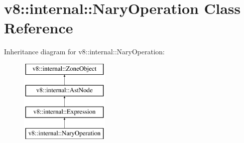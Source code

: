 \hypertarget{classv8_1_1internal_1_1NaryOperation}{}\section{v8\+:\+:internal\+:\+:Nary\+Operation Class Reference}
\label{classv8_1_1internal_1_1NaryOperation}
Inheritance diagram for v8\+:\+:internal\+:\+:Nary\+Operation\+:\begin{figure}[H]
\begin{center}
\leavevmode
\includegraphics[height=4.000000cm]{classv8_1_1internal_1_1NaryOperation}
\end{center}
\end{figure}
